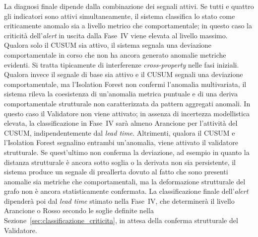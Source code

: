 La diagnosi finale dipende dalla combinazione dei segnali attivi. Se tutti e quattro gli indicatori sono
attivi simultaneamente, il sistema classifica lo stato come criticamente anomalo sia a livello
metrico che comportamentale; in questo caso la criticità dell'\textit{alert} in uscita dalla
Fase~IV viene elevata al livello massimo. Qualora solo il \gls{CUSUM} sia attivo, il sistema
segnala una deviazione comportamentale in corso che non ha ancora generato anomalie metriche
evidenti. Si tratta tipicamente di interferenze \textit{cross-property} nelle fasi iniziali.
Qualora invece il segnale di base sia attivo e il \gls{CUSUM} segnali una deviazione comportamentale, 
ma l'Isolation Forest non confermi l'anomalia multivariata, il sistema rileva la coesistenza di un'anomalia 
metrica puntuale e di una deriva comportamentale strutturale non caratterizzata da pattern aggregati anomali. 
In questo caso il Validatore non viene attivato; in assenza di incertezza modellistica elevata, 
la classificazione in Fase~IV sarà almeno Arancione per l'attività del \gls{CUSUM}, indipendentemente dal \textit{lead time}.
Altrimenti, qualora il \gls{CUSUM} e l'Isolation Forest segnalino entrambi un'anomalia, viene attivato
il validatore strutturale. Se quest'ultimo non conferma la deviazione, ad esempio in quanto la
distanza strutturale è ancora sotto soglia o la derivata non sia persistente, il sistema produce 
un segnale di preallerta dovuto al fatto che sono presenti anomalie sia metriche
che comportamentali, ma la deformazione strutturale del grafo non è ancora statisticamente confermata. 
La classificazione finale dell'\textit{alert} dipenderà poi dal \textit{lead time} 
stimato nella Fase~IV, che determinerà il livello Arancione o Rosso secondo le soglie definite nella 
Sezione~\ref{sec:classificazione_criticita}, in attesa della conferma strutturale 
del Validatore. 
